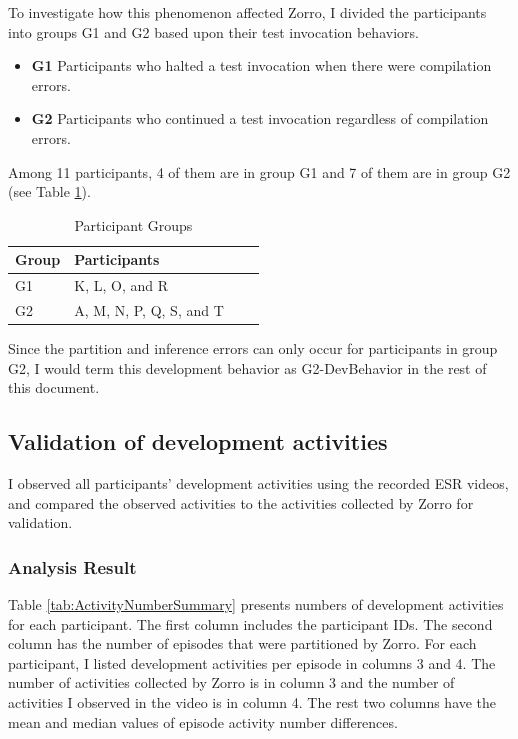 To investigate how this phenomenon affected Zorro, I divided the 
participants into groups G1 and G2 based upon their test invocation
behaviors.
\begin{itemize}
\item \textbf{G1} Participants who halted a test invocation when there were compilation errors.
\item \textbf{G2} Participants who continued a test invocation regardless of compilation errors.
\end{itemize}
Among 11 participants, 4 of them are in group G1 and 7 of them are in group 
G2 (see Table \ref{tab:ParticipantCategory}).  
\begin{table}[!ht]
\centering
  \begin{tabular}{|l|l|l|l|}
  \hline
    Group &  Participants \\ \hline
    G1	     &  K, L, O, and R \\ \hline
    G2	     &  A, M, N, P, Q, S, and T  \\ \hline
    \end{tabular}
  \caption{Participant Groups}\label{tab:ParticipantCategory}  
\end{table}

Since the partition and inference errors can only occur for 
participants in group G2, I would term this development behavior
as G2-DevBehavior in the rest of this document.

\subsection{Validation of development activities}
\label{subsec:SensorDataValidation}
I observed all participants' development activities using the recorded ESR
videos, and compared the observed activities to the activities collected
by Zorro for validation. 

\subsubsection{Analysis Result}
Table \ref{tab:ActivityNumberSummary} presents numbers of development
activities for each participant. The first column includes the participant 
IDs. The second column has the number of episodes that were partitioned
by Zorro. For each participant, I listed development activities per episode
in columns 3 and 4. The number of activities collected by Zorro is in 
column 3 and the number of activities I observed in the video is in column 
4. The rest two columns have the mean and median values of episode activity 
number differences.

